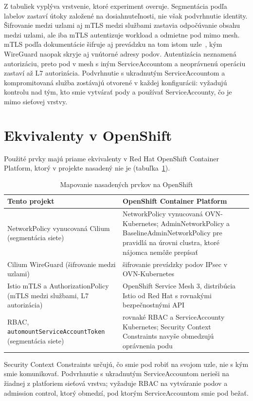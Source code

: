 Z tabuliek vyplýva vrstvenie, ktoré experiment overuje. Segmentácia podľa labelov zastaví útoky založené na dosiahnuteľnosti, nie však podvrhnutie identity. Šifrovanie medzi uzlami aj mTLS medzi službami zastavia odpočúvanie obsahu medzi uzlami, ale iba mTLS autentizuje workload a odmietne pod mimo mesh. mTLS podľa dokumentácie šifruje aj prevádzku na tom istom uzle~\cite{istio-security,cilium-wireguard}, kým WireGuard naopak skryje aj vnútorné adresy podov. Autentizácia neznamená autorizáciu, preto pod v mesh s iným ServiceAccountom a neoprávnenú operáciu zastaví až L7 autorizácia. Podvrhnutie s ukradnutým ServiceAccountom a kompromitovaná služba zostávajú otvorené v každej konfigurácii: vyžadujú kontrolu nad tým, kto smie vytvárať pody a používať ServiceAccounty, čo je mimo sieťovej vrstvy.

\section{Ekvivalenty v OpenShift}
\label{sec:openshift}

Použité prvky majú priame ekvivalenty v Red Hat OpenShift Container Platform, ktorý v projekte nasadený nie je (tabuľka~\ref{tab:openshift}).

\begin{table}[ht!]
  \centering
  \caption{Mapovanie nasadených prvkov na OpenShift}
  \label{tab:openshift}
  \footnotesize
  \renewcommand{\arraystretch}{1.15}
  \begin{tabularx}{\textwidth}{@{}>{\raggedright\arraybackslash}p{4.2cm}
      >{\raggedright\arraybackslash}X@{}}
    \toprule
    Tento projekt & OpenShift Container Platform \\
    \midrule
    NetworkPolicy vynucovaná Cilium (segmentácia siete) & NetworkPolicy vynucovaná OVN-Kubernetes; AdminNetworkPolicy a BaselineAdminNetworkPolicy pre pravidlá na úrovni clustra, ktoré nájomca nemôže prepísať~\cite{ocp-network-security} \\
    Cilium WireGuard (šifrovanie medzi uzlami) & šifrovanie prevádzky podov IPsec v OVN-Kubernetes~\cite{ocp-network-security} \\
    Istio mTLS a AuthorizationPolicy (mTLS medzi službami, L7 autorizácia) & OpenShift Service Mesh 3, distribúcia Istio od Red Hat s rovnakými bezpečnostnými API~\cite{ossm3-intro} \\
    RBAC, \texttt{automount\allowbreak ServiceAccount\allowbreak Token} (segmentácia siete) & rovnaké RBAC a ServiceAccounty Kubernetes; Security Context Constraints navyše obmedzujú oprávnenia podu~\cite{ocp-scc} \\
    \bottomrule
  \end{tabularx}
\end{table}

Security Context Constraints určujú, čo smie pod robiť na svojom uzle, nie s kým smie komunikovať. Podvrhnutie s ukradnutým ServiceAccountom nerieši na žiadnej z platforiem sieťová vrstva; vyžaduje RBAC na vytváranie podov a admission control, ktorý obmedzí, pod ktorým ServiceAccountom smie pod bežať.
